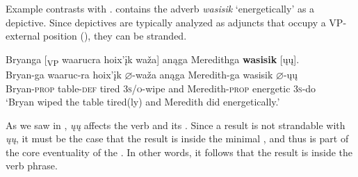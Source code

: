 \documentclass[output=paper]{LSP/langsci}
\begin{document}
\begin{exe}
\ex\label{ex:rosen:24}
\begin{xlist}



\end{xlist}
\end{exe}

Example  contrasts with .   contains the adverb \emph{wasisik} `energetically' as a depictive. Since depictives are typically analyzed as adjuncts that occupy a VP-external position (\citealt{LevinRappaportHovav1995}), they can be stranded.

\begin{exe}

\ex\label{ex:rosen:25} \glll Bryanga [\textsubscript{VP} waarucra hoix'įk waža\textsc] anąga  Meredithga \textbf{wasisik} [ųų]. \\
 Bryan-ga {} waaruc-ra hoix'įk {$\varnothing$}-waža anąga Meredith-ga  wasisik {$\varnothing$}-ųų\\
Bryan-\textsc{prop} {} table-\textsc{def} tired \textsc{3s/o}-wipe and Meredith-\textsc{prop}  energetic \textsc{3s}-do\\
\glt `Bryan wiped the table tired(ly) and Meredith did energetically.'

\end{exe}

As we saw in , \textit{ųų} affects the verb and its . Since a result  is not strandable with \textit{ųų}, it must be the case that the result is inside the minimal , and thus is part of the core eventuality of the . In other words, it follows that the result is inside the verb phrase.
\end{document}
